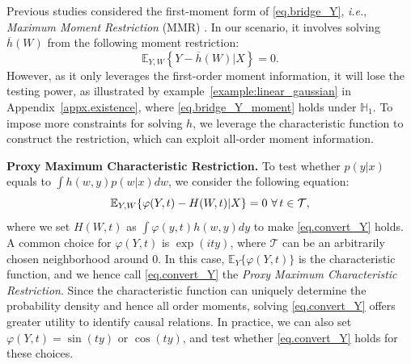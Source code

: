 \documentclass[
  12pt]{article}
\newtheorem{remark}{Remark}
\def\mE{\mathbb{E}}
\def\mH{\mathbb{H}}
\def\cT{\mathcal{T}}
\def\mE{\mathbb{E}}
\begin{document}
Previous studies considered the first-moment form of \eqref{eq.bridge_Y}, \emph{i.e.},  \emph{Maximum Moment Restriction} (MMR) \citep{mastouri2021proximal, kallus2021causal}. In our scenario, it involves solving $\overline{h}(W)$ from the following moment restriction:
\begin{equation}
\label{eq.bridge_Y_moment}
    \mE_{Y,W}\left\{ Y - \overline{h}(W) |X\right\} = 0.
\end{equation}
However, as it only leverages the first-order moment information, it will lose the testing power, as illustrated by example~\ref{example:linear_gaussian} in Appendix~\ref{appx.existence}, where \eqref{eq.bridge_Y_moment} holds under $\mH_1$. 
To impose more constraints for solving $h$, we leverage the characteristic function to construct the restriction, which can exploit all-order moment information. 

\textbf{Proxy Maximum Characteristic Restriction.} To test whether $p(y|x)$ equals to $\int h(w,y)p(w|x)dw$, we consider the following equation:
\begin{equation}\label{eq.convert_Y}
   \mathbb{E}_{Y,W}\{ \varphi(Y,t) -H(W,t) |X\} =0 \ \forall \thinspace t \in \cT,
\end{equation}
where we set $H(W,t)$ as $\int \varphi(y,t)h(w,y)dy$ to make \eqref{eq.convert_Y} holds. A common choice for $\varphi(Y,t)$ is $\exp(ity)$, where $\cT$ can be an arbitrarily chosen neighborhood around $0$. In this case, $\mE_Y\{\varphi(Y,t)\}$ is the characteristic function, and we hence call \eqref{eq.convert_Y} the \emph{Proxy Maximum Characteristic Restriction}. Since the characteristic function can uniquely determine the probability density and hence all order moments, solving \eqref{eq.convert_Y} offers greater utility to identify causal relations. In practice, we can also set $\varphi(Y,t) = \sin(ty)$ or $\cos(ty)$, and test whether \eqref{eq.convert_Y} holds for these choices.  
\end{document}
